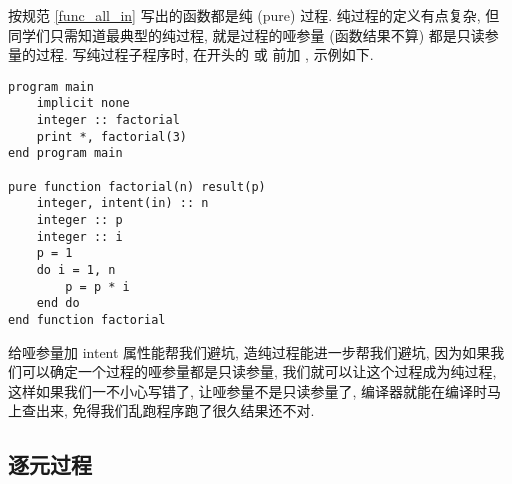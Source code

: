 按规范 \ref{func_all_in} 写出的函数都是纯 (pure) 过程. 纯过程的定义有点复杂, 但同学们只需知道最典型的纯过程, 就是过程的哑参量 (函数结果不算) 都是只读参量的过程. 写纯过程子程序时, 在开头的  或  前加 , 示例如下.
\begin{lstlisting}
program main
    implicit none
    integer :: factorial
    print *, factorial(3)
end program main

pure function factorial(n) result(p)
    integer, intent(in) :: n
    integer :: p
    integer :: i 
    p = 1
    do i = 1, n
        p = p * i
    end do
end function factorial
\end{lstlisting}
给哑参量加 intent 属性能帮我们避坑, 造纯过程能进一步帮我们避坑, 因为如果我们可以确定一个过程的哑参量都是只读参量, 我们就可以让这个过程成为纯过程, 这样如果我们一不小心写错了, 让哑参量不是只读参量了, 编译器就能在编译时马上查出来, 免得我们乱跑程序跑了很久结果还不对. 

\subsection{逐元过程}\label{elemental_procedure}

